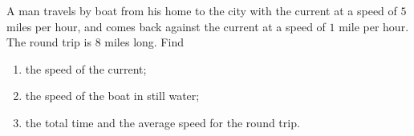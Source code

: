 A man travels by boat from his home to the city with the current at a speed of $5$ miles per hour, and comes back against the current at a speed of $1$ mile per hour. The round trip is $8$ miles long. Find
\begin{enumerate}
\item[(a)] the speed of the current;
\item[(b)] the speed of the boat in still water;
\item[(c)] the total time and the average speed for the round trip.
\end{enumerate}
